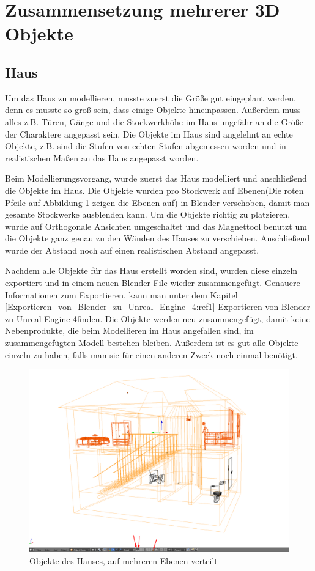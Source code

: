 \section{Zusammensetzung mehrerer 3D Objekte}
\subsection{Haus}
\label{haus:ref1}
Um das Haus zu modellieren, musste zuerst die Größe gut eingeplant werden, denn es musste so groß sein, dass einige Objekte hineinpassen.
Außerdem muss alles z.B. Türen, Gänge und die Stockwerkhöhe im Haus ungefähr an die Größe der Charaktere angepasst sein.
Die Objekte im Haus sind angelehnt an echte Objekte, z.B. sind die Stufen von echten Stufen abgemessen worden und in realistischen Maßen an das Haus angepasst worden.

Beim Modellierungsvorgang, wurde zuerst das Haus modelliert und anschließend die Objekte im Haus. Die Objekte wurden pro Stockwerk auf Ebenen(Die roten Pfeile auf Abbildung \ref{Haus:image1} zeigen
die Ebenen auf) in Blender verschoben, damit man gesamte Stockwerke ausblenden kann. Um die Objekte richtig zu platzieren, wurde auf Orthogonale Ansichten umgeschaltet
und das Magnettool benutzt um die Objekte ganz genau zu den Wänden des Hauses zu verschieben. Anschließend wurde der Abstand noch auf einen realistischen Abstand angepasst.

Nachdem alle Objekte für das Haus erstellt worden sind, wurden diese einzeln exportiert und in einem neuen Blender File wieder zusammengefügt. Genauere Informationen zum Exportieren, kann
man unter dem Kapitel \ref{Exportieren_von_Blender_zu_Unreal_Engine_4:ref1} \dq Exportieren von Blender zu Unreal Engine 4\dq finden. Die Objekte werden neu zusammengefügt, damit keine Nebenprodukte, die beim Modellieren
im Haus angefallen sind, im zusammengefügten Modell bestehen bleiben. Außerdem ist es gut alle Objekte einzeln zu haben, falls man sie für einen anderen Zweck noch einmal benötigt.

\begin{figure}[h]
    \centering
    \includegraphics[width=.8\textwidth]{images/Haus-zusammenfuegen_Ebenen.png}
    \caption{Objekte des Hauses, auf mehreren Ebenen verteilt}
    \label{Haus:image1}
\end{figure}